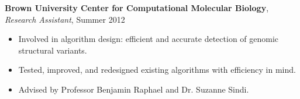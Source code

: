 \vspace{6pt}
{\bf Brown University Center for Computational Molecular Biology}, \emph{Research Assistant}, Summer 2012\\
\vspace*{-.15in}
\begin{itemize}[topsep=0pt,itemsep=-1pt]
\item Involved in algorithm design: efficient and accurate detection of genomic structural variants.
\item Tested, improved, and redesigned existing algorithms with efficiency in mind. 
\item Advised by Professor Benjamin Raphael and Dr. Suzanne Sindi.
\end{itemize}


